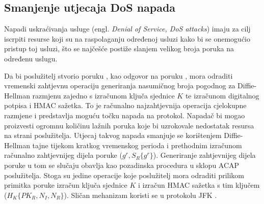 \subsection{Smanjenje utjecaja DoS napada}
\label{sec:dos}
Napadi uskraćivanja usluge (engl.
\emph{Denial of Service, DoS attacks}) imaju za cilj iscrpiti resurse koji su na
raspolaganju određenoj usluzi kako bi se onemogućio pristup toj usluzi, što se
najčešće postiže slanjem velikog broja poruka na određenu uslugu.

Da bi 
poslužitelj stvorio poruku \initr{}, kao odgovor na poruku \initi{}, mora
odraditi
vremenski zahtjevnu operaciju generiranja nasumičnog broja pogodnog za
Diffie-Hellman razmjenu zajedno s izračunom ključa sjednice $K$ te izračunom
digitalnog potpisa i HMAC sažetka. To je računalno najzahtjevnija operacija
cjelokupne razmjene i predstavlja moguću točku napada na protokol.
Napadač bi mogao proizvesti ogromnu količinu lažnih \initi{} poruka koje bi
uzrokovale nedostatak resursa na strani poslužitelja.
Utjecaj takvog napada smanjuje se korištenjem Diffie-Hellman tajne tijekom
kratkog vremenskog perioda i prethodnim izračunom računalno zahtjevnijeg dijela
\initr{} poruke ($g^r, S_R\{g^r\}$). Generiranje zahtjevnijeg dijela poruke u
tom se slučaju obavlja kao pozadinska procedura u sklopu ACAP poslužitelja. Stoga
su jedine operacije koje poslužitelj mora
odraditi prilikom primitka poruke \initr{} izračun ključa sjednice
$K$ i izračun HMAC sažetka s tim ključem ($H_K\{PK_R, N_I, N_R\}$). Sličan
mehanizam koristi se u protokolu JFK \cite{aiello2004jfk}.


